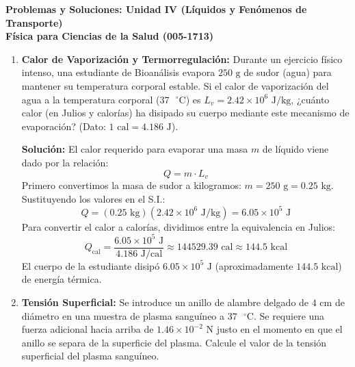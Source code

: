 \documentclass[12pt,letterpaper]{article}
\begin{document}
\begin{center}
    \textbf{\Large Problemas y Soluciones: Unidad IV (Líquidos y Fenómenos de Transporte)}\\
    \vspace{0.2cm}
    \textbf{Física para Ciencias de la Salud (005-1713)}\\
\end{center}

\vspace{0.5cm}

\begin{enumerate}

    \item \textbf{Calor de Vaporización y Termorregulación:} Durante un ejercicio físico intenso, una estudiante de Bioanálisis evapora $250 \text{ g}$ de sudor (agua) para mantener su temperatura corporal estable. Si el calor de vaporización del agua a la temperatura corporal ($37 \text{ }^{\circ}\text{C}$) es $L_v = 2.42 \times 10^6 \text{ J/kg}$, ¿cuánto calor (en Julios y calorías) ha disipado su cuerpo mediante este mecanismo de evaporación? (Dato: $1 \text{ cal} = 4.186 \text{ J}$).
    
    \textbf{Solución:}
    El calor requerido para evaporar una masa $m$ de líquido viene dado por la relación:
    \[
    Q = m \cdot L_v
    \]
    Primero convertimos la masa de sudor a kilogramos: $m = 250 \text{ g} = 0.25 \text{ kg}$.
    Sustituyendo los valores en el S.I.:
    \[
    Q = (0.25 \text{ kg})(2.42 \times 10^6 \text{ J/kg}) = 6.05 \times 10^5 \text{ J}
    \]
    Para convertir el calor a calorías, dividimos entre la equivalencia en Julios:
    \[
    Q_{\text{cal}} = \frac{6.05 \times 10^5 \text{ J}}{4.186 \text{ J/cal}} \approx 144529.39 \text{ cal} \approx 144.5 \text{ kcal}
    \]
    El cuerpo de la estudiante disipó $6.05 \times 10^5 \text{ J}$ (aproximadamente $144.5 \text{ kcal}$) de energía térmica.

    \vspace{0.3cm}
    \item \textbf{Tensión Superficial:} Se introduce un anillo de alambre delgado de $4 \text{ cm}$ de diámetro en una muestra de plasma sanguíneo a $37 \text{ }^{\circ}\text{C}$. Se requiere una fuerza adicional hacia arriba de $1.46 \times 10^{-2} \text{ N}$ justo en el momento en que el anillo se separa de la superficie del plasma. Calcule el valor de la tensión superficial del plasma sanguíneo.
    

\end{enumerate}
\end{document}
